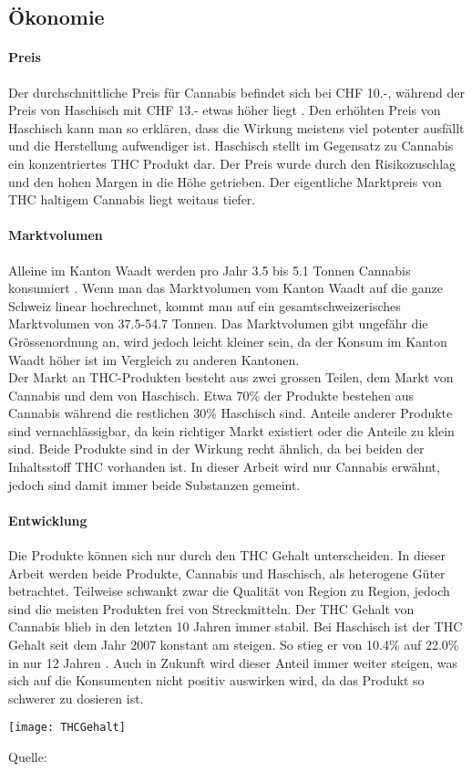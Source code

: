 \documentclass[../main.tex]{subfiles}
\begin{document}
	
	\subsection{Ökonomie}
	
	\paragraph{Preis}
	Der durchschnittliche Preis für Cannabis befindet sich bei CHF 10.-, während der Preis von Haschisch mit CHF 13.- etwas höher liegt \cite{zobel}.
	Den erhöhten Preis von Haschisch kann man so erklären, dass die Wirkung meistens viel potenter ausfällt und die Herstellung aufwendiger ist.
	Haschisch stellt im Gegensatz zu Cannabis ein konzentriertes THC Produkt dar.
	Der Preis wurde durch den Risikozuschlag und den hohen Margen in die Höhe getrieben.
	Der eigentliche Marktpreis von THC haltigem Cannabis liegt weitaus tiefer.
	
	
	\paragraph{Marktvolumen}
	Alleine im Kanton Waadt werden pro Jahr 3.5 bis 5.1 Tonnen Cannabis konsumiert \cite{zobel}. 	
	Wenn man das Marktvolumen vom Kanton Waadt auf die ganze Schweiz linear hochrechnet, kommt man auf ein gesamtschweizerisches Marktvolumen von 37.5-54.7 Tonnen.
	Das Marktvolumen gibt ungefähr die Grössenordnung an, wird jedoch leicht kleiner sein, da der Konsum im Kanton Waadt höher ist im Vergleich zu anderen Kantonen.
	\\
	
	\noindent
	Der Markt an THC-Produkten besteht aus zwei grossen Teilen, dem Markt von Cannabis und dem von Haschisch.
	Etwa 70\% der Produkte bestehen aus Cannabis während die restlichen 30\% Haschisch sind.
	Anteile anderer Produkte sind vernachlässigbar, da kein richtiger Markt existiert oder die Anteile zu klein sind.
	Beide Produkte sind in der Wirkung recht ähnlich, da bei beiden der Inhaltsstoff THC vorhanden ist.
	In dieser Arbeit wird nur Cannabis erwähnt, jedoch sind damit immer beide Substanzen gemeint.
	
	\paragraph{Entwicklung}
	Die Produkte können sich nur durch den THC Gehalt unterscheiden.
	In dieser Arbeit werden beide Produkte, Cannabis und Haschisch, als heterogene Güter betrachtet.
	Teilweise schwankt zwar die Qualität von Region zu Region, jedoch sind die meisten Produkten frei von Streckmitteln.
	Der THC Gehalt von Cannabis blieb in den letzten 10 Jahren immer stabil.
	Bei Haschisch ist der THC Gehalt seit dem Jahr 2007 konstant am steigen.
	So stieg er von 10.4\% auf 22.0\% in nur 12 Jahren \cite{sgrm}.
	Auch in Zukunft wird dieser Anteil immer weiter steigen, was sich auf die Konsumenten nicht positiv auswirken wird, da das Produkt so schwerer zu dosieren ist.
	
	\noindent
	{
		\centering
		\texttt{[image: THCGehalt]}
		\captionsetup{font=small}
		\small 
		\noindent
		\begin{center}
		Quelle: \cite{sgrm}
		\end{center}
	}	
	
\end{document}

